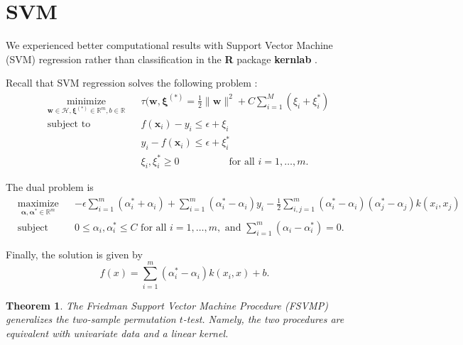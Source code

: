 \documentclass{article} %
\providecommand{\norm}[1]{\lVert#1\rVert}
\newtheorem{thm}{Theorem}[section]
\theoremstyle{remark}
\begin{document}
\section{SVM}
We experienced better computational results with Support Vector
Machine (SVM) regression rather
than classification in the {\bf R} \cite{cran} package {\bf kernlab} \cite{kernlab}.

Recall that SVM regression solves the following problem \cite{scholkopf2002learning}:
\begin{equation*}
\begin{aligned}
& \underset{\mathbf{w}\in\mathcal{H},\mathbf{\xi}^{(*)}\in\mathbb{R}^m,b\in\mathbb{R}}{\text{minimize}}
& &\tau(\mathbf{w},\mathbf{\xi}^{(*)}=\frac{1}{2}\norm{\mathbf{w}}^2+C\sum_{i=1}^M(\xi_i+\xi_i^*) \\
& \text{subject to}
& & f(\mathbf{x}_i)-y_i \leq \epsilon +\xi_i\\
&&& y_i-f(\mathbf{x}_i) \leq \epsilon+\xi_i^* \\
&&& \xi_i,\xi_i^*\geq0 \qquad \qquad \quad \text{for all } i=1,\ldots,m.
\end{aligned}
\end{equation*}

The dual problem is
\begin{equation*}
\begin{aligned}
& \underset{\mathbf{\alpha},\mathbf{\alpha}^*\in\mathbb{R}^m}{\text{maximize}}
& & -\epsilon
\sum_{i=1}^m(\alpha_i^*+\alpha_i)+\sum_{i=1}^m(\alpha_i^*-\alpha_i)y_i
-\frac{1}{2}\sum_{i,j=1}^m(\alpha_i^*-\alpha_i)(\alpha_j^*-\alpha_j)k(x_i,x_j) \\
& \text{subject to}
& & 0\leq\alpha_i,\alpha_i^*\leq C \text{ for all } i=1,\ldots,m,
\text{ and } \sum_{i=1}^m(\alpha_i-\alpha_i^*)=0.
\end{aligned}
\end{equation*}

Finally, the solution is given by
\begin{equation*}
  f(x)=\sum_{i=1}^m(\alpha_i^*-\alpha_i)k(x_i,x)+b.
\end{equation*}

\begin{thm}
  The Friedman Support Vector Machine Procedure (FSVMP) generalizes the two-sample permutation $t$-test. Namely, the two procedures are equivalent with univariate data and a linear kernel.
\end{thm}
\end{document}
